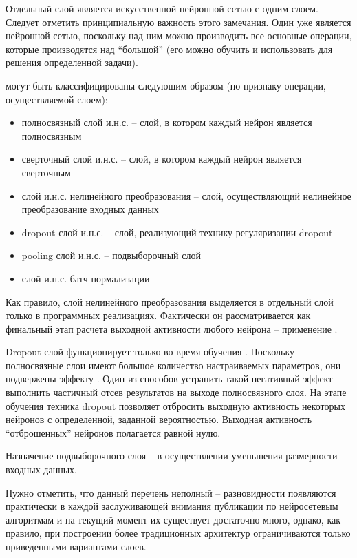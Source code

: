 Отдельный слой является искусственной нейронной сетью с одним слоем.
Следует отметить принципиальную важность этого замечания. Один   уже является нейронной сетью, поскольку над ним можно производить все основные операции, которые производятся над ``большой''  (его можно обучить и использовать для решения определенной задачи).

 могут быть классифицированы следующим образом (по признаку операции, осуществляемой слоем):
\begin{itemize}
	\item полносвязный слой и.н.с. -- слой, в котором каждый нейрон является полносвязным
	\item сверточный слой и.н.с. -- слой, в котором каждый нейрон является сверточным
	\item слой и.н.с. нелинейного преобразования -- слой, осуществляющий нелинейное преобразование входных данных
	\item dropout слой и.н.с. -- слой, реализующий технику регуляризации dropout
	\item pooling слой и.н.с. -- подвыборочный слой
	\item слой и.н.с. батч-нормализации
\end{itemize}

Как правило, слой нелинейного преобразования выделяется в отдельный слой только в программных реализациях. Фактически он рассматривается как финальный этап расчета выходной активности любого нейрона -- применение .

Dropout-слой функционирует только во время обучения . Поскольку полносвязные слои имеют большое количество настраиваемых параметров, они подвержены эффекту . Один из способов устранить такой негативный эффект -- выполнить частичный отсев результатов на выходе полносвязного слоя. На этапе обучения техника dropout позволяет отбросить выходную активность некоторых нейронов с определенной, заданной вероятностью. Выходная активность ``отброшенных'' нейронов полагается равной нулю.

Назначение подвыборочного слоя -- в осуществлении уменьшения размерности входных данных.

Нужно отметить, что данный перечень неполный -- разновидности  появляются практически в каждой заслуживающей внимания публикации по нейросетевым алгоритмам и на текущий момент их существует достаточно много, однако, как правило, при построении более традиционных архитектур ограничиваются только приведенными вариантами слоев.

